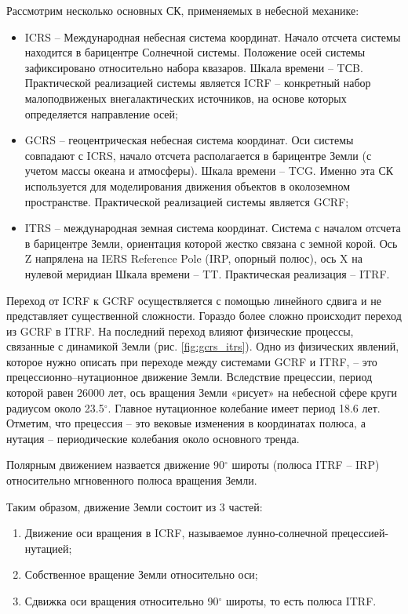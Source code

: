 Рассмотрим несколько основных СК, применяемых в небесной механике:
\begin{itemize}
    \item ICRS -- Международная небесная система координат. Начало отсчета системы находится
    в барицентре Солнечной системы. Положение осей системы зафиксировано относительно набора
    квазаров. Шкала времени -- TСB. Практической реализацией системы является ICRF -- конкретный набор
    малоподвиженых внегалактических источников, на основе которых определяется направление осей;
    \item GCRS -- геоцентрическая небесная система координат.
    Оси системы совпадают с ICRS, 
    начало отсчета располагается в барицентре Земли (с учетом массы океана и атмосферы).
    Шкала времени -- TCG. 
    Именно эта СК используется
    для моделирования движения объектов в околоземном пространстве.
    Практической реализацией системы является GCRF;
    \item ITRS -- международная земная система координат. Система с началом отсчета в барицентре Земли, ориентация которой
    жестко связана с земной корой. Ось Z напрялена на IERS Reference Pole (IRP, опорный полюс), ось X на нулевой меридиан Шкала времени -- TT.
    Практическая реализация -- ITRF.
\end{itemize}

Переход от ICRF к GCRF осуществляется с помощью линейного сдвига и не представляет
существенной сложности. Гораздо более сложно происходит переход из GCRF в ITRF.
На последний переход влияют физические процессы, связанные с динамикой Земли
(рис. \ref{fig:gcrs_itrs}).
Одно из физических явлений, которое нужно описать при переходе между системами GCRF и
ITRF, -- это прецессионно--нутационное движение Земли. Вследствие прецессии, период которой
равен 26000 лет, ось вращения Земли «рисует» на небесной сфере круги радиусом
около 23.5$^\circ$. Главное нутационное колебание имеет период 18.6 лет.
Отметим, что прецессия -- это вековые изменения в координатах полюса, 
а нутация -- периодические колебания около основного тренда.

Полярным движением назвается движение 90$^\circ$ широты (полюса ITRF -- IRP)
относительно мгновенного полюса вращения Земли.

Таким образом, движение Земли состоит из 3 частей:
\begin{enumerate}
    \item Движение оси вращения в ICRF, называемое лунно-солнечной прецессией-нутацией;
    \item Собственное вращение Земли относительно оси;
    \item Сдвижка оси вращения относительно 90$^\circ$ широты, то есть полюса ITRF.
\end{enumerate}

